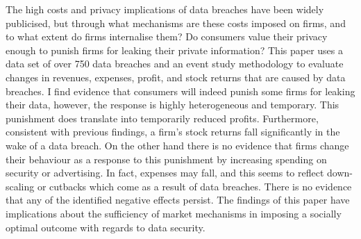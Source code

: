 \documentclass[../Main.tex]{subfiles}
\begin{document}
\begin{spacing}{1}
The high costs and privacy implications of data breaches have been widely publicised, but through what mechanisms are these costs imposed on firms, and to what extent do firms internalise them? Do consumers value their privacy enough to punish firms for leaking their private information? This paper uses a data set of over 750 data breaches and an event study methodology to evaluate changes in revenues, expenses, profit, and stock returns that are caused by data breaches. I find evidence that consumers will indeed punish some firms for leaking their data, however, the response is highly heterogeneous and temporary. This punishment does translate into temporarily reduced profits. Furthermore, consistent with previous findings, a firm's stock returns fall significantly in the wake of a data breach. On the other hand there is no evidence that firms change their behaviour as a response to this punishment by increasing spending on security or advertising. In fact, expenses may fall, and this seems to reflect down-scaling or cutbacks which come as a result of data breaches. There is no evidence that any of the identified negative effects persist. The findings of this paper have implications about the sufficiency of market mechanisms in imposing a socially optimal outcome with regards to data security.
\end{spacing}

\biblio %
\end{document}
